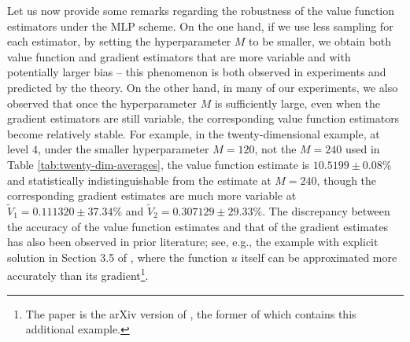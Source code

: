 \documentclass[11pt]{article}
\theoremstyle{definition}
\theoremstyle{plain}
\begin{document}
Let us now provide some remarks regarding the robustness of the value function estimators under the MLP scheme. 
On the one hand, if we use less sampling for each estimator, by setting the hyperparameter $M$ to be smaller, 
we obtain both value function and gradient estimators that are more variable and with potentially larger bias 
-- this phenomenon is both observed in experiments and predicted by the theory. 
On the other hand, in many of our experiments, we also observed that once the hyperparameter $M$ is sufficiently large, 
even when the gradient estimators are still variable, 
the corresponding value function estimators become relatively stable.
For example, in the twenty-dimensional example, at level $4$, under the smaller hyperparameter $M=120$, not the $M=240$ used in Table \ref{tab:twenty-dim-averages}, 
the value function estimate is $10.5199 \pm 0.08\%$ and statistically indistinguishable from the estimate at $M=240$, 
though the corresponding gradient estimates are much more variable at $\tilde V_1 = 0.111320 \pm 37.34\%$ and $\tilde V_2 = 0.307129 \pm 29.33\%$. 
The discrepancy between the accuracy of the value function estimates and that of the gradient estimates 
has also been observed in prior literature; see, e.g., the example with explicit solution in Section 3.5 of \cite{hutzenthaler2019multilevel_arxiv}, 
where the function $u$ itself can be approximated more accurately than its gradient\footnote{The paper \cite{hutzenthaler2019multilevel_arxiv} is the arXiv version of \cite{hutzenthaler2019multilevel}, 
the former of which contains this additional example.}. 

\end{document}

